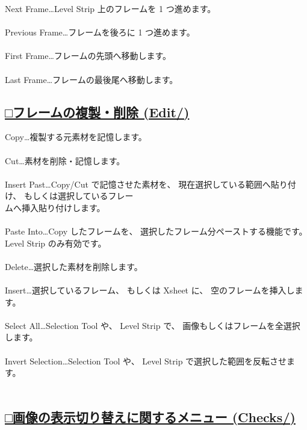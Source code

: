 \documentclass[a4paper,10pt]{article}
\begin{document}
\noindent Next Frame…Level Strip 上のフレームを 1 つ進めます。\\[-0.1em]
\\
Previous Frame…フレームを後ろに 1 つ進めます。\\[-0.1em]
\\
First Frame…フレームの先頭へ移動します。\\[-0.1em]
\\
Last Frame…フレームの最後尾へ移動します。\\[-0.1em]

\subsection*{\uline{□フレームの複製・削除 (Edit/)}}

\noindent Copy…複製する元素材を記憶します。\\[-0.1em]
\\
Cut…素材を削除・記憶します。\\[-0.1em]
\\
Insert Past…Copy/Cut で記憶させた素材を、 現在選択している範囲へ貼り付け、 もしくは選択しているフレー\\[-0.1em]
ムへ挿入貼り付けします。\\
\\
Paste Into…Copy したフレームを、 選択したフレーム分ペーストする機能です。 Level Strip のみ有効です。\\[-0.1em]
\\
Delete…選択した素材を削除します。\\[-0.1em]
\\
Insert…選択しているフレーム、 もしくは Xsheet に、 空のフレームを挿入します。\\[-0.1em]
\\
Select All…Selection Tool や、 Level Strip で、 画像もしくはフレームを全選択します。\\[-0.1em]
\\
Invert Selection…Selection Tool や、 Level Strip で選択した範囲を反転させます。\\[-0.1em]
\\

\subsection*{\uline{□画像の表示切り替えに関するメニュー (Checks/)}}
\end{document}
